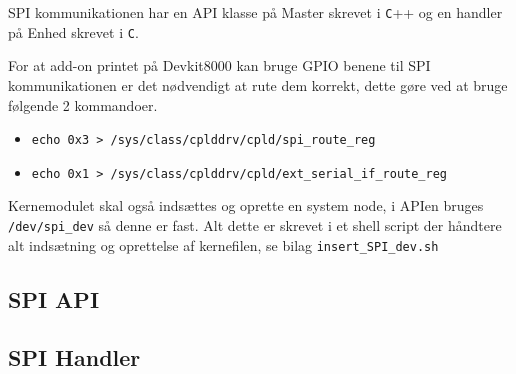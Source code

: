


SPI kommunikationen har en API klasse på Master skrevet i \verb+C+++ og en handler på Enhed skrevet i \verb+C+.

For at add-on printet på Devkit8000 kan bruge GPIO benene til SPI kommunikationen er det nødvendigt at rute dem korrekt, dette gøre ved at bruge følgende 2 kommandoer.

\begin{itemize}
\item \verb+echo 0x3 > /sys/class/cplddrv/cpld/spi_route_reg+
\item \verb+echo 0x1 > /sys/class/cplddrv/cpld/ext_serial_if_route_reg+
\end{itemize}

Kernemodulet skal også indsættes og oprette en system node, i APIen bruges \verb+/dev/spi_dev+ så denne er fast.
Alt dette er skrevet i et shell script der håndtere alt indsætning og oprettelse af kernefilen, se bilag \verb+insert_SPI_dev.sh+


\subsection{SPI API}




\subsection{SPI Handler}



